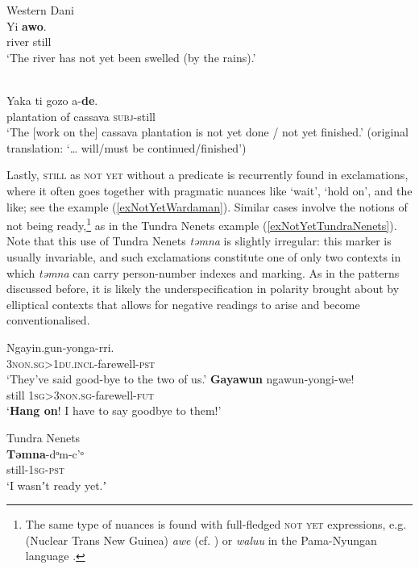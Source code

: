 \begin{exe}
	\ex\label{exNotYetDaniRiver}
	Western Dani\\
	\gll Yi \textbf{awo}.\\
	river still\\
	\glt \lq The river has not yet been swelled (by the rains).' \parencite[440]{Barclay2008}
	
	\ex\label{exNotYetSangoCassava}
	\\
	\gll Yaka ti gozo	 a-\textbf{de}.\\
	plantation	of cassava \textsc{subj}-still\\
	\glt \lq The [work on the] cassava plantation is not yet done / not yet finished.' (original translation: \lq… will/must be continued/finished')
	\\\parencite[115]{NassensteinPasch2021}
\end{exe}

Lastly, \textsc{still} as \textsc{not yet} without a predicate is recurrently found in exclamations, where it often goes together with pragmatic nuances like \lq wait', \lq hold on', and the like; see the  example (\ref{exNotYetWardaman}). Similar cases involve the notions of not being ready,\footnote{The same type of nuances is found with full-fledged \textsc{not yet} expressions, e.g.   (Nuclear Trans New Guinea) \textit{awe} (cf. \cite[308, 449]{Sarvasy2017}) or \textit{waluu} in the Pama-Nyungan language  \parencite[259]{Glacon2014}.} as in the Tundra Nenets example (\ref{exNotYetTundraNenets}). Note that this use of Tundra Nenets \textit{təmna} is slightly irregular: this marker is usually invariable, and such exclamations constitute one of only two contexts in which \textit{təmna} can carry person-number indexes and  marking. As in the patterns discussed before, it is likely the underspecification in polarity brought about by elliptical contexts that allows for negative readings to arise and become conventionalised.

\begin{exe}
	\ex {}\label{exNotYetWardaman}
	\begin{xlist}
		\gll Ngayin.gun-yonga-rri.\\
		3\textsc{non}.\textsc{sg}>1\textsc{du}.\textsc{incl}-farewell-\textsc{pst}\\
		\glt \lq They've said good-bye to the two of us.'
		\gll \textbf{Gayawun} ngawun-yongi-we!\\
		still 1\textsc{sg}>3\textsc{non}.\textsc{sg}-farewell-\textsc{fut}\\
		\glt \lq \textbf{Hang on}! I have to say goodbye to them!' \parencite[323]{Merlan1994}
	\end{xlist}
	\ex Tundra Nenets\label{exNotYetTundraNenets}\\
	\gll\textbf{Təmna}-dᵒm-c'ᵒ\\
	still-1\textsc{sg}-\textsc{pst}\\
	\glt \lq I wasnʼt ready yet.ʼ \parencite[187]{Nikolaeva2014}
\end{exe}

